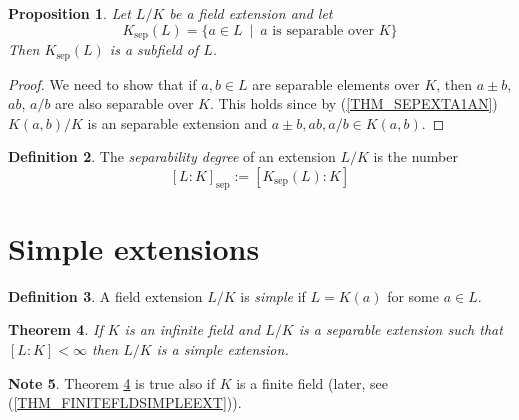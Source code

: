 \documentclass[12pt, letterpaper, oneside]{article}
\theoremstyle{plain}
\newtheorem{theorem}{Theorem}[section]
\newtheorem{proposition}[theorem]{Proposition}
\theoremstyle{definition}
\newtheorem{definition}[theorem]{Definition}
\newtheorem{note}[theorem]{Note}
\newcommand{\vs}{\vskip 5mm}
\begin{document}
\vs\vs


\begin{proposition}
Let $L/K$ be a field extension and let 
$$K_{\text{sep}}(L) = \{ a\in L \ \mid \ \text{$a$  is separable over $K$}\}$$
Then $K_{\text{sep}}(L) $ is a subfield of $L$. 
\end{proposition}


\vs

\begin{proof}
We need to show that if $a, b\in L$ are separable elements over $K$, then 
$a\pm b$, $ab$, $a/b$ are also separable over $K$. This holds since 
by (\ref{THM_SEPEXTA1AN}) $K(a, b)/K$ is an separable extension and 
$a\pm b, ab, a/b \in K(a, b)$.
\end{proof}


\vs\vs

\begin{definition}
The \emph{separability degree} of an extension $L/K$ is the number
$$[L:K]_{\text{sep}} := [K_{\text{sep}}(L)  : K]$$
\end{definition}







\newpage
\section{Simple extensions}
\label{SEC_SIMPLEEXT}

\begin{definition}
A field extension $L/K$ is \emph{simple} if $L = K(a)$ for some $a\in L$. 
\end{definition}

\vs\vs

\begin{theorem}
\label{THM_SEPEXTISSIMPLE}
If $K$ is an infinite field and $L/K$ is a separable extension such that $[L:K] < \infty$
then $L/K$ is a simple extension.
\end{theorem}


\vs\vs

\begin{note}
Theorem \ref{THM_SEPEXTISSIMPLE} is true also if $K$ is a finite field 
(later, see (\ref{THM_FINITEFLDSIMPLEEXT})). 
\end{note}

\vs\vs
\end{document}
